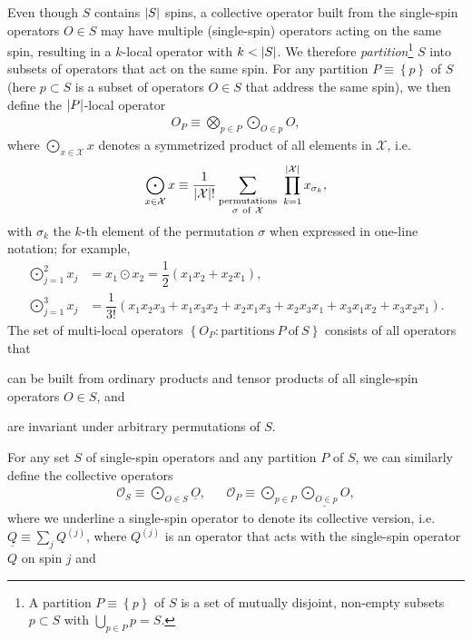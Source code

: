 \documentclass[nofootinbib,notitlepage,11pt]{revtex4-2}
\renewcommand{\t}{\text} %
\newcommand{\f}[2]{\dfrac{#1}{#2}} %
\newcommand{\p}[1]{\left(#1\right)} %
\renewcommand{\set}[1]{\left\{#1\right\}} %
\newcommand{\1}{\mathds{1}}
\renewcommand{\O}{\mathcal{O}}
\newcommand{\X}{\mathcal{X}}
\newcommand{\col}{\underline}
\begin{document}
Even though $S$ contains $\abs{S}$ spins, a collective operator built
from the single-spin operators $O\in S$ may have multiple
(single-spin) operators acting on the same spin, resulting in a
$k$-local operator with $k<\abs{S}$.  We therefore {\it
  partition}\footnote{A partition $P\equiv\set{p}$ of $S$ is a set of
  mutually disjoint, non-empty subsets $p\subset S$ with
  $\bigcup_{p\in P}p=S$.} $S$ into subsets of operators that act on
the same spin.  For any partition $P\equiv\set{p}$ of $S$ (here
$p\subset S$ is a subset of operators $O\in S$ that address the same
spin), we then define the $\abs{P}$-local operator
\begin{align}
  O_P \equiv \bigotimes_{p\in P} \bigodot_{O\in p} O,
\end{align}
where $\bigodot_{x\in\X} x$ denotes a symmetrized product of all
elements in $\X$, i.e.
\begin{align}
  \bigodot_{x\in\X} x
  \equiv \f1{\abs{\X}!}
  \sum_{\substack{\t{permutations}\\\sigma~\t{of}~\X}}
  ~ \prod_{k=1}^{\abs{\X}} x_{\sigma_k},
\end{align}
with $\sigma_k$ the $k$-th element of the permutation $\sigma$ when
expressed in one-line notation; for example,
\begin{align}
  \bigodot_{j=1}^2 x_j &= x_1 \odot x_2 = \f12 \p{x_1x_2 + x_2x_1}, \\
  \bigodot_{j=1}^3 x_j
  &= \f1{3!} \p{x_1x_2x_3 + x_1x_3x_2 + x_2x_1x_3
    + x_2x_3x_1 + x_3x_1x_2 + x_3x_2x_1}.
\end{align}
The set of multi-local operators $\set{O_P:\t{partitions}~P~\t{of}~S}$
consists of all operators that
\begin{enumerate*}
\item can be built from ordinary products and tensor products of all
  single-spin operators $O\in S$, and
\item are invariant under arbitrary permutations of $S$.
\end{enumerate*}
For any set $S$ of single-spin operators and any partition $P$ of $S$,
we can similarly define the collective operators
\begin{align}
  \O_S \equiv \bigodot_{O\in S} \col{O},
  &&
  \O_P \equiv \bigodot_{p\in P} \col{\textstyle\bigodot_{O\in p} O},
\end{align}
where we underline a single-spin operator to denote its collective
version, i.e.~$\col{Q}\equiv\sum_j Q^{(j)}$, where $Q^{(j)}$ is an
operator that acts with the single-spin operator $Q$ on spin $j$ and
\end{document}
